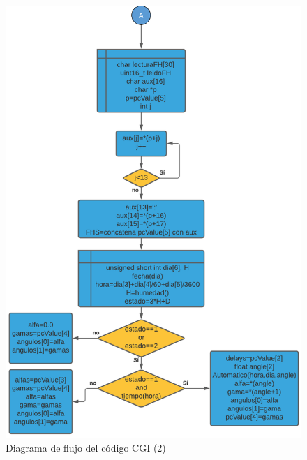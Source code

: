 \begin{figure}[H]
	\centering
	\includegraphics[width=\columnwidth]{imagenes/Diagrama CGI 2.png}
	\caption{Diagrama de flujo del código CGI (2)}
	\label{fig:dia_flujCGI2}
\end{figure}

